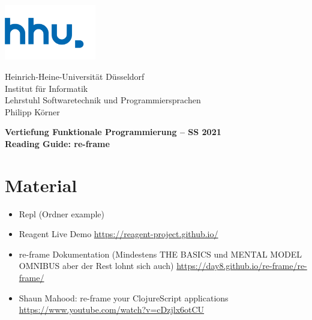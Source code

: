 \documentclass[11pt,a4paper]{article}
\theoremstyle{break}
\begin{document}
\begin{minipage}[b]{\textwidth}
\parbox[t]{5cm}{%
\includegraphics[width=4cm]{unilogo}
\hfill
}
\parbox[b]{11cm}{%
Heinrich-Heine-Universit\"at D\"usseldorf\\
Institut f\"ur Informatik\\
Lehrstuhl Softwaretechnik und Programmiersprachen\\
Philipp K\"orner
}

\end{minipage}
\begin{center}
\bf
Vertiefung Funktionale Programmierung -- SS 2021\\
Reading Guide: re-frame
\end{center}

\pagestyle{empty}


\section{Material}

\begin{itemize}
    \item Repl (Ordner example)
    \item Reagent Live Demo \url{https://reagent-project.github.io/}
    \item re-frame Dokumentation (Mindestens THE BASICS und MENTAL MODEL OMNIBUS aber der Rest lohnt sich auch) \url{https://day8.github.io/re-frame/re-frame/}
    \item Shaun Mahood: re-frame your ClojureScript applications \url{https://www.youtube.com/watch?v=cDzjlx6otCU}
\end{itemize}
\end{document}
